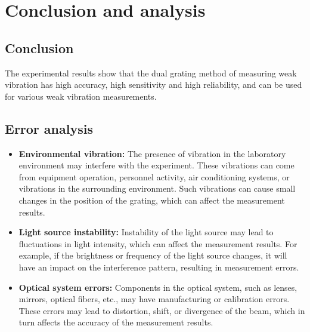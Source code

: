 \documentclass[UTF8]{article}
\begin{document}
\section{Conclusion and analysis}
\subsection{Conclusion}
The experimental results show that the dual grating method of measuring weak vibration has high accuracy, high sensitivity and high reliability, and can be used for various weak vibration measurements.

\subsection{Error analysis}
\begin{itemize}
  \item \textbf{Environmental vibration:} The presence of vibration in the laboratory environment may interfere with the experiment. These vibrations can come from equipment operation, personnel activity, air conditioning systems, or vibrations in the surrounding environment. Such vibrations can cause small changes in the position of the grating, which can affect the measurement results.
  
  \item\textbf{ Light source instability:} Instability of the light source may lead to fluctuations in light intensity, which can affect the measurement results. For example, if the brightness or frequency of the light source changes, it will have an impact on the interference pattern, resulting in measurement errors.
  
  \item \textbf{Optical system errors:} Components in the optical system, such as lenses, mirrors, optical fibers, etc., may have manufacturing or calibration errors. These errors may lead to distortion, shift, or divergence of the beam, which in turn affects the accuracy of the measurement results.
\end{itemize}
\end{document}
